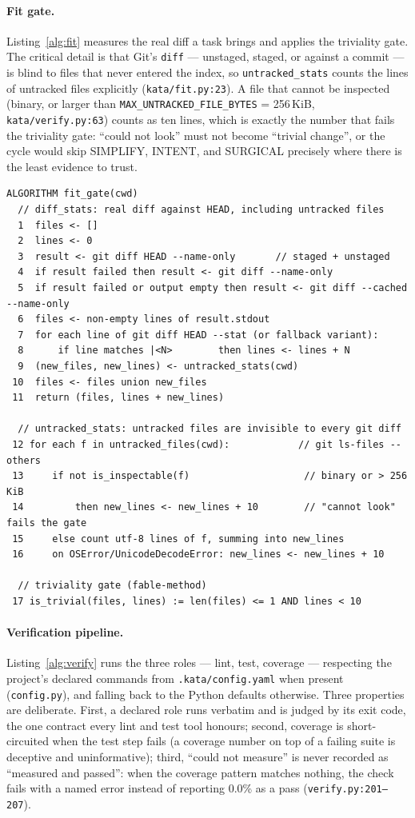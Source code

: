 \documentclass[11pt]{article}
\begin{document}
\paragraph{Fit gate.} Listing~\ref{alg:fit} measures the real diff a task
brings and applies the triviality gate. The critical detail is that Git's
\texttt{diff} --- unstaged, staged, or against a commit --- is blind to
files that never entered the index, so \texttt{untracked\_stats} counts the
lines of untracked files explicitly (\texttt{kata/fit.py:23}). A file that
cannot be inspected (binary, or larger than
\texttt{MAX\_UNTRACKED\_FILE\_BYTES} = 256\,KiB, \texttt{kata/verify.py:63})
counts as ten lines, which is exactly the number that fails the triviality
gate: ``could not look'' must not become ``trivial change'', or the cycle
would skip SIMPLIFY, INTENT, and SURGICAL precisely where there is the
least evidence to trust.

\begin{lstlisting}[caption=fit gate (kata/fit.py).,label=alg:fit]
ALGORITHM fit_gate(cwd)
  // diff_stats: real diff against HEAD, including untracked files
  1  files <- []
  2  lines <- 0
  3  result <- git diff HEAD --name-only       // staged + unstaged
  4  if result failed then result <- git diff --name-only
  5  if result failed or output empty then result <- git diff --cached --name-only
  6  files <- non-empty lines of result.stdout
  7  for each line of git diff HEAD --stat (or fallback variant):
  8      if line matches |<N>        then lines <- lines + N
  9  (new_files, new_lines) <- untracked_stats(cwd)
 10  files <- files union new_files
 11  return (files, lines + new_lines)

  // untracked_stats: untracked files are invisible to every git diff
 12 for each f in untracked_files(cwd):            // git ls-files --others
 13     if not is_inspectable(f)                    // binary or > 256 KiB
 14         then new_lines <- new_lines + 10        // "cannot look" fails the gate
 15     else count utf-8 lines of f, summing into new_lines
 16     on OSError/UnicodeDecodeError: new_lines <- new_lines + 10

  // triviality gate (fable-method)
 17 is_trivial(files, lines) := len(files) <= 1 AND lines < 10
\end{lstlisting}

\paragraph{Verification pipeline.} Listing~\ref{alg:verify} runs the three
roles --- lint, test, coverage --- respecting the project's declared
commands from \texttt{.kata/config.yaml} when present (\texttt{config.py}),
and falling back to the Python defaults otherwise. Three properties are
deliberate. First, a declared role runs verbatim and is judged by its exit
code, the one contract every lint and test tool honours; second, coverage
is short-circuited when the test step fails (a coverage number on top of a
failing suite is deceptive and uninformative); third, ``could not measure'' is never recorded as
``measured and passed'': when the coverage pattern matches nothing, the
check fails with a named error instead of reporting 0.0\% as a pass
(\texttt{verify.py:201--207}).
\end{document}
